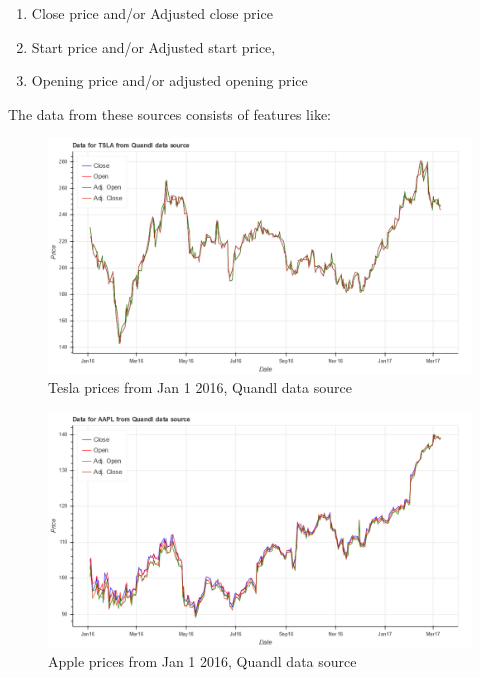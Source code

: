\documentclass[12pt]{article}
\begin{document}
\begin{itemize}
\begin{enumerate}
\item Close price and/or Adjusted close price
\item Start price and/or Adjusted start price,
\item Opening price  and/or adjusted opening price
\end{enumerate}



The data from these sources consists of features like:


\begin{figure}[!htbp]
\begin{center}
\includegraphics[height=0.5\textheight,width=\textwidth]{price_plot_TSLA.png}
\caption{Tesla prices from Jan 1 2016, Quandl data source}
\label{fig:tsla}
\end{center}
\end{figure}

\begin{figure}[!htbp]
\begin{center}
\includegraphics[height=0.5\textheight,width=\textwidth]{price_plot_AAPL.png}
\caption{Apple prices from Jan 1 2016, Quandl data source}
\label{fig:aapl}
\end{center}
\end{figure}


\end{itemize}
\end{document}
